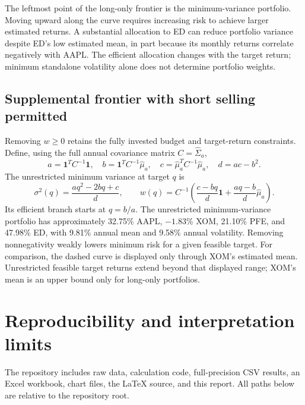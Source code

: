 \documentclass[10pt,letterpaper]{article}
\newcommand{\ones}{\mathbf{1}}
\begin{document}
The leftmost point of the long-only frontier is the minimum-variance portfolio.
Moving upward along the curve requires increasing risk to achieve larger
estimated returns. A substantial allocation to ED can reduce portfolio
variance despite ED's low estimated mean, in part because its monthly
returns correlate negatively with AAPL. The efficient allocation changes
with the target return; minimum standalone volatility alone does not determine
portfolio weights.

\subsection*{Supplemental frontier with short selling permitted}
Removing $w\geq0$ retains the fully invested budget and target-return
constraints. Define, using the full annual covariance matrix $C=\widehat\Sigma_a$,
\begin{equation}
 a=\ones^TC^{-1}\ones,\quad
 b=\ones^TC^{-1}\widehat\mu_a,\quad
 c=\widehat\mu_a^TC^{-1}\widehat\mu_a,\quad d=ac-b^2.
\end{equation}
The unrestricted minimum variance at target $q$ is
\begin{equation}
 \sigma^2(q)=\frac{aq^2-2bq+c}{d},\qquad
 w(q)=C^{-1}\left(\frac{c-bq}{d}\ones+
                         \frac{aq-b}{d}\widehat\mu_a\right).
\end{equation}
Its efficient branch starts at $q=b/a$. The unrestricted minimum-variance
portfolio has approximately 32.75\% AAPL, $-1.83$\% XOM, 21.10\% PFE, and
47.98\% ED, with 9.81\% annual mean and 9.58\% annual volatility. Removing
nonnegativity weakly lowers minimum risk for a given feasible target.
For comparison, the dashed curve is displayed only through XOM's estimated
mean. Unrestricted feasible target returns extend beyond that displayed
range; XOM's mean is an upper bound only for long-only portfolios.

\clearpage
\section{Reproducibility and interpretation limits}
The repository includes raw data, calculation code, full-precision CSV results,
an Excel workbook, chart files, the LaTeX source, and this report. All paths
below are relative to the repository root.
\end{document}
